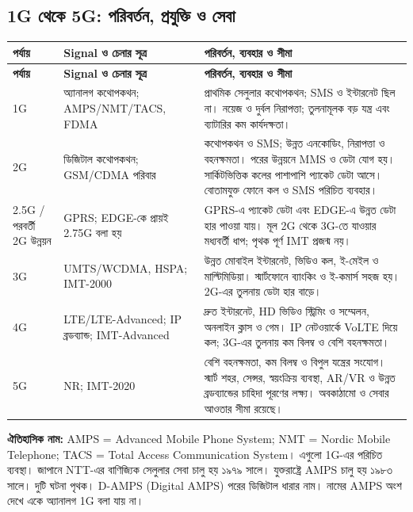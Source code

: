 \subsection{1G থেকে 5G: পরিবর্তন, প্রযুক্তি ও সেবা}
\begin{longtable}{|p{}|p{}|p{}|}\hline
\textbf{পর্যায়} & \textbf{Signal ও চেনার সূত্র} & \textbf{পরিবর্তন, ব্যবহার ও সীমা}\\\hline
\endfirsthead\hline\textbf{পর্যায়} & \textbf{Signal ও চেনার সূত্র} & \textbf{পরিবর্তন, ব্যবহার ও সীমা}\\\hline\endhead
1G & অ্যানালগ কথোপকথন; AMPS/NMT/TACS, FDMA & প্রাথমিক সেলুলার কথোপকথন; SMS ও ইন্টারনেট ছিল না। নয়েজ ও দুর্বল নিরাপত্তা; তুলনামূলক বড় যন্ত্র এবং ব্যাটারির কম কার্যদক্ষতা।\\\hline
2G & ডিজিটাল কথোপকথন; GSM/CDMA পরিবার & কথোপকথন ও SMS; উন্নত এনকোডিং, নিরাপত্তা ও বহনক্ষমতা। পরের উন্নয়নে MMS ও ডেটা যোগ হয়। সার্কিটভিত্তিক কলের পাশাপাশি প্যাকেট ডেটা আসে। বোতামযুক্ত ফোনে কল ও SMS পরিচিত ব্যবহার।\\\hline
2.5G / পরবর্তী 2G উন্নয়ন & GPRS; EDGE-কে প্রায়ই 2.75G বলা হয় & GPRS-এ প্যাকেট ডেটা এবং EDGE-এ উন্নত ডেটা হার পাওয়া যায়। মূল 2G থেকে 3G-তে যাওয়ার মধ্যবর্তী ধাপ; পৃথক পূর্ণ IMT প্রজন্ম নয়।\\\hline
3G & UMTS/WCDMA, HSPA; IMT-2000 & উন্নত মোবাইল ইন্টারনেট, ভিডিও কল, ই-মেইল ও মাল্টিমিডিয়া। স্মার্টফোনে ব্যাংকিং ও ই-কমার্স সহজ হয়। 2G-এর তুলনায় ডেটা হার বাড়ে।\\\hline
4G & LTE/LTE-Advanced; IP ব্রডব্যান্ড; IMT-Advanced & দ্রুত ইন্টারনেট, HD ভিডিও স্ট্রিমিং ও সম্মেলন, অনলাইন ক্লাস ও গেম। IP নেটওয়ার্কে VoLTE দিয়ে কল; 3G-এর তুলনায় কম বিলম্ব ও বেশি বহনক্ষমতা।\\\hline
5G & NR; IMT-2020 & বেশি বহনক্ষমতা, কম বিলম্ব ও বিপুল যন্ত্রের সংযোগ। স্মার্ট শহর, সেন্সর, স্বয়ংক্রিয় ব্যবস্থা, AR/VR ও উন্নত ব্রডব্যান্ডের চাহিদা পূরণের লক্ষ্য। অবকাঠামো ও সেবার আওতার সীমা রয়েছে।\\\hline
\end{longtable}
\textbf{ঐতিহাসিক নাম:} AMPS = Advanced Mobile Phone System; NMT = Nordic Mobile Telephone; TACS = Total Access Communication System। এগুলো 1G-এর পরিচিত ব্যবস্থা। জাপানে NTT-এর বাণিজ্যিক সেলুলার সেবা চালু হয় ১৯৭৯ সালে। যুক্তরাষ্ট্রে AMPS চালু হয় ১৯৮৩ সালে। দুটি ঘটনা পৃথক। D-AMPS (Digital AMPS) পরের ডিজিটাল ধারার নাম। নামের AMPS অংশ দেখে একে অ্যানালগ 1G বলা যায় না।

